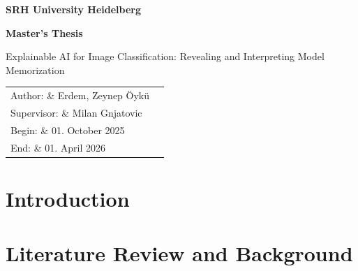 \documentclass[10pt]{report}
\begin{document}
\begin{titlepage}
\thispagestyle{empty}
\begin{center}

\vspace*{1cm}


\vspace{1.2cm}

{\Large \textbf{SRH University Heidelberg}}

\vspace{1.8cm}

{\LARGE \textbf{Master’s Thesis}}

\vspace{1.2cm}

{\Large Explainable AI for Image Classification: Revealing and Interpreting Model Memorization}

\vspace{2.5cm}

\begin{tabular}{ll}
Author: \& Erdem, Zeynep Öykü \\
Supervisor: \& Milan Gnjatovic \\
Begin: \& 01. October 2025 \\
End: \& 01. April 2026 \\
\end{tabular}

\vfill
\end{center}
\end{titlepage}

\clearpage
{}
\begin{abstract}
    burda ingilizce abstract
\end{abstract}
\clearpage
\begin{abstract}
    burda almanca abstract olucak
\end{abstract}
\clearpage
\tableofcontents
\clearpage
{}
\setcounter{page}{5}
\listoffigures
\clearpage
\listoftables
\clearpage

\section{Introduction} 

\clearpage 
\section{Literature Review and Background}

\clearpage
\end{document}
